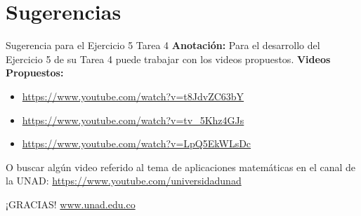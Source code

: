 \documentclass{beamer}
\begin{document}
\section{Sugerencias}
\begin{frame}{Sugerencia para el Ejercicio 5 Tarea 4}
    \textbf{Anotación:} Para el desarrollo del Ejercicio 5 de su Tarea 4 puede trabajar con los videos propuestos.
    \textbf{Videos Propuestos:}
    \begin{itemize}
        \item \url{https://www.youtube.com/watch?v=t8JdvZC63bY} 
        \item \url{https://www.youtube.com/watch?v=tv_5Khz4GJs} 
        \item \url{https://www.youtube.com/watch?v=LpQ5EkWLsDc} 
    \end{itemize}
    O buscar algún video referido al tema de aplicaciones matemáticas en el canal de la UNAD: \url{https://www.youtube.com/universidadunad} 
\end{frame}

\begin{frame}
    \centering
    \Huge ¡GRACIAS! 
    \vspace{1cm}
    \Large \url{www.unad.edu.co} 
    \vspace{0.5cm}
\end{frame}
\end{document}
